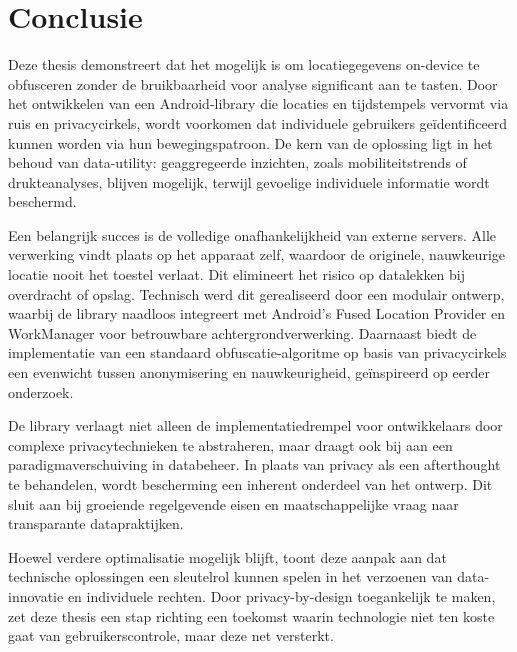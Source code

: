 \chapter{Conclusie}\label{chap:conclusie}
Deze thesis demonstreert dat het mogelijk is om locatiegegevens on-device te obfusceren zonder de bruikbaarheid voor analyse significant aan te tasten. Door het ontwikkelen van een Android-library die locaties en tijdstempels vervormt via ruis en privacycirkels, wordt voorkomen dat individuele gebruikers geïdentificeerd kunnen worden via hun bewegingspatroon. De kern van de oplossing ligt in het behoud van data-utility: geaggregeerde inzichten, zoals mobiliteitstrends of drukteanalyses, blijven mogelijk, terwijl gevoelige individuele informatie wordt beschermd.

Een belangrijk succes is de volledige onafhankelijkheid van externe servers. Alle verwerking vindt plaats op het apparaat zelf, waardoor de originele, nauwkeurige locatie nooit het toestel verlaat. Dit elimineert het risico op datalekken bij overdracht of opslag. Technisch werd dit gerealiseerd door een modulair ontwerp, waarbij de library naadloos integreert met Android’s Fused Location Provider en WorkManager voor betrouwbare achtergrondverwerking. Daarnaast biedt de implementatie van een standaard obfuscatie-algoritme op basis van privacycirkels een evenwicht tussen anonymisering en nauwkeurigheid, geïnspireerd op eerder onderzoek.

De library verlaagt niet alleen de implementatiedrempel voor ontwikkelaars door complexe privacytechnieken te abstraheren, maar draagt ook bij aan een paradigmaverschuiving in databeheer. In plaats van privacy als een afterthought te behandelen, wordt bescherming een inherent onderdeel van het ontwerp. Dit sluit aan bij groeiende regelgevende eisen en maatschappelijke vraag naar transparante datapraktijken.

Hoewel verdere optimalisatie mogelijk blijft, toont deze aanpak aan dat technische oplossingen een sleutelrol kunnen spelen in het verzoenen van data-innovatie en individuele rechten. Door privacy-by-design toegankelijk te maken, zet deze thesis een stap richting een toekomst waarin technologie niet ten koste gaat van gebruikerscontrole, maar deze net versterkt.